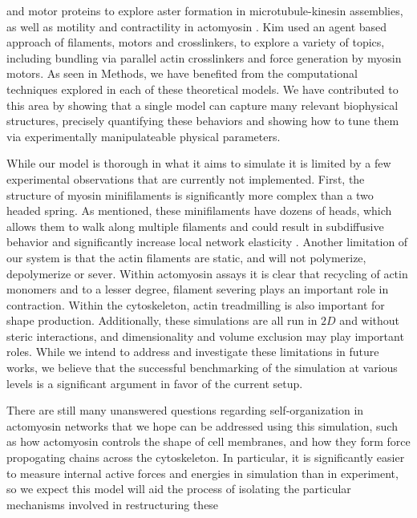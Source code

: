 \documentclass[12pt]{article}
\begin{document}
and motor proteins to explore aster formation in microtubule-kinesin assemblies,
as well as motility and contractility in actomyosin
\cite{nedelec2002,nedelec2007,ennomani2016}. 
Kim used an agent based approach of filaments, motors and crosslinkers, to
explore a variety of topics, including bundling via parallel actin crosslinkers 
and force generation by myosin motors\cite{kim2009b, kim2014}. As seen in
Methods, we have benefited from the computational techniques explored in each of
these theoretical models. We have contributed to this area by showing that a 
single model can capture many relevant biophysical structures, precisely 
quantifying these behaviors and showing how to tune them via experimentally 
manipulateable physical parameters. 
\par
While our model is thorough in what it aims to simulate it is limited by a few
experimental observations that are currently not implemented. First, the
structure of myosin minifilaments is significantly more complex than a two
headed spring. As mentioned, these minifilaments have dozens of heads, which
allows them to walk along multiple filaments and could result in subdiffusive
behavior \cite{scholz2016} and significantly increase local network elasticity
\cite{murrellTalk}.
Another limitation of our system is that the actin filaments are static, and
will not polymerize, depolymerize or sever. Within actomyosin assays it is clear
that recycling of actin monomers and to a lesser degree, filament severing 
plays an important role in contraction\cite{murrell2012}. Within the
cytoskeleton, actin treadmilling is also important for shape production.
Additionally, these simulations are all run in $2D$ and without steric
interactions, and dimensionality and volume exclusion may play important roles. 
While we intend to address and investigate these limitations in future works, we
believe that the successful benchmarking of the simulation at various levels is
a significant argument in favor of the current setup.
\par 
There are still many unanswered questions regarding self-organization in
actomyosin networks that we hope can be addressed using this simulation, such as
how actomyosin controls the shape of cell membranes, and how they form force
propogating chains across the cytoskeleton\cite{fraley2005,dasanyake2011}. 
In particular, it is significantly easier to measure internal active forces and
energies in simulation than in experiment, so we expect this model will aid the
process of isolating the particular mechanisms involved in restructuring these
\end{document}
